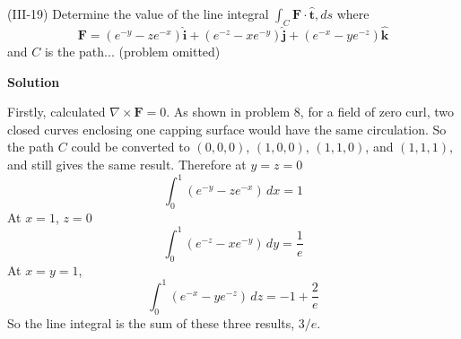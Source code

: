 \documentclass{article}
\begin{document}
\begin{homeworkProblem}
	(III-19) Determine the value of the line integral $\int_C\mathbf{F}\cdot\hat{\mathbf{t}},ds$ where
	\[
		\mathbf{F}=(e^{-y}-ze^{-x})\hat{\mathbf{i}}+(e^{-z}-xe^{-y})\hat{\mathbf{j}}+(e^{-x}-ye^{-z})\hat{\mathbf{k}}
	\]
	and $C$ is the path... (problem omitted)

	\textbf{Solution}

	Firstly, calculated $\nabla\times\mathbf{F}=0$. As shown in problem 8, for a field of zero curl, two closed curves enclosing one capping surface would have the same circulation. So the path $C$ could be converted to $(0,0,0)$, $(1,0,0)$, $(1,1,0)$, and $(1,1,1)$, and still gives the same result. Therefore at $y=z=0$
	\[
		\int_0^1\left(e^{-y}-ze^{-x}\right)\,dx=1
	\]
	At $x=1$, $z=0$
	\[
		\int_0^1\left(e^{-z}-xe^{-y}\right)\,dy=\frac{1}{e}
	\]
	At $x=y=1$,
	\[
		\int_0^1\left(e^{-x}-ye^{-z}\right)\,dz=-1+\frac{2}{e}
	\]
	So the line integral is the sum of these three results, $3/e$.
\end{homeworkProblem}

\end{document}
